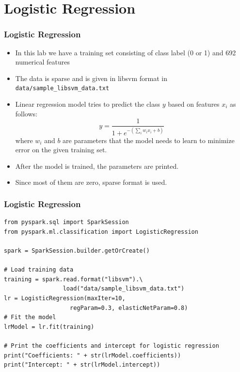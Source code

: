 \documentclass{beamer}
\begin{document}
\section{Logistic Regression}
\begin{frame}[fragile]
\frametitle{Logistic Regression}
\begin{itemize}
\item In this lab we have a training set consisting of class label (0 or 1) and 692 numerical features
\item The data is sparse and is given in libsvm format in {\color{mycolorcli}\verb|data/sample_libsvm_data.txt|}
\item Linear regression model tries to predict the class $y$ based on features 
  $x_i$ as follows:
  \begin{equation*}
    y = \frac{1}{1 + e^{-(\sum_{i}{w_i x_i} + b)}} 
  \end{equation*}
  where $w_i$ and $b$ are parameters that the model needs to learn to minimize error on the given training set. 
  \item After the model is trained, the parameters are printed. 
  \item Since most of them are zero, sparse format is used.
\end{itemize}
\end{frame}


\begin{frame}[fragile]
\frametitle{Logistic Regression}
{\small
{\color{mycolorcode}
\begin{verbatim}
from pyspark.sql import SparkSession
from pyspark.ml.classification import LogisticRegression

spark = SparkSession.builder.getOrCreate()

# Load training data
training = spark.read.format("libsvm").\
                 load("data/sample_libsvm_data.txt")
lr = LogisticRegression(maxIter=10, 
                   regParam=0.3, elasticNetParam=0.8)
# Fit the model
lrModel = lr.fit(training)

# Print the coefficients and intercept for logistic regression
print("Coefficients: " + str(lrModel.coefficients))
print("Intercept: " + str(lrModel.intercept))
\end{verbatim}
}
}
\end{frame}
\end{document}
